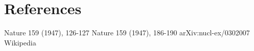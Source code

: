 \documentclass[
10pt, %
a4paper, %
oneside, %
headinclude,footinclude, %
BCOR5mm, %
]{scrartcl}
\begin{document}


%

\section{References}

\begin{thebibliography}{3} 
Nature 159 (1947), 126-127
Nature 159 (1947), 186-190
arXiv:nucl-ex/0302007
Wikipedia 
\end{thebibliography}










\end{document}
